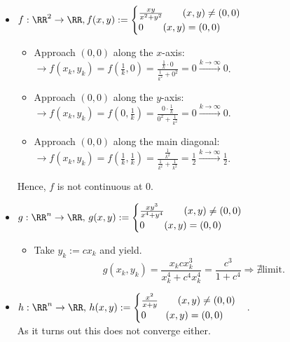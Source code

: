 \begin{exam}\ 
 \begin{itemize}
  \item $f:\RR^2\to\RR, f(x,y):=\begin{cases}\frac{xy}{x^2+y^2}\qquad(x,y)\neq(0,0)\\0\qquad(x,y)=(0,0)\end{cases}$
  \begin{itemize}
   \item Approach $(0,0)$ along the $x$-axis: $\longrightarrow f(x_k,y_k)=f(\frac{1}{k},0)=\frac{\frac{1}{k}\cdot 0}{\frac{1}{k^2}+0^2}=0\overset{k\to\infty}{\longrightarrow}0$.
   \item Approach $(0,0)$ along the $y$-axis: $\longrightarrow f(x_k,y_k)=f(0,\frac{1}{k})=\frac{0\cdot\frac{1}{k}}{0^2+\frac{1}{k^2}}=0\overset{k\to\infty}{\longrightarrow}0$.
   \item Approach $(0,0)$ along the main diagonal: $\longrightarrow f(x_k,y_k)=f(\frac{1}{k},\frac{1}{k})=\frac{\frac{1}{k^2}}{\frac{1}{k^2}+\frac{1}{k^2}}=\frac{1}{2}\overset{k\to\infty}{\longrightarrow}\frac{1}{2}$.
  \end{itemize}
  Hence, $f$ is not continuous at $0$.
  \item $g:\RR^n\to\RR, \,g(x,y):=\begin{cases}\frac{xy^3}{x^4+y^4}\qquad(x,y)\neq(0,0)\\0\qquad(x,y)=(0,0)\end{cases}$
  \begin{itemize}
   \item Take $y_k:=cx_k$ and yield. $$g(x_k, y_k)=\frac{x_kcx_k^3}{x_k^4+c^4x_k^4}=\frac{c^3}{1+c^4}\Rightarrow \nexists \text{limit}.$$
  \end{itemize}
  \item $h:\RR^n\to\RR, \,h(x,y):=\begin{cases}\frac{x^2}{x+y}\qquad(x,y)\neq(0,0)\\0\qquad(x,y)=(0,0)\end{cases}$.\\
  As it turns out this does not converge either.
 \end{itemize}
\end{exam}
